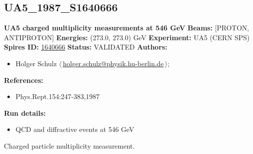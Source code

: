 \clearpage


\clearpage

\subsection[UA5\_1987\_S1640666]{UA5\_1987\_S1640666\,\cite{Alner:1987wb}}
\textbf{UA5 charged multiplicity measurements at 546 GeV}\newline
\textbf{Beams:} [PROTON, ANTIPROTON] \newline
\textbf{Energies:} (273.0, 273.0) GeV \newline
\textbf{Experiment:} UA5 (CERN SPS) \newline
\textbf{Spires ID:} \href{http://www.slac.stanford.edu/spires/find/hep/www?rawcmd=key+1640666}{1640666}\newline
\textbf{Status:} VALIDATED\newline
\textbf{Authors:}
\begin{itemize}
  \item Holger Schulz $\langle\,$\href{mailto:holger.schulz@physik.hu-berlin.de}{holger.schulz@physik.hu-berlin.de}$\,\rangle$;
\end{itemize}
\textbf{References:}
\begin{itemize}
  \item Phys.Rept.154:247-383,1987
\end{itemize}
\textbf{Run details:}
\begin{itemize}

  \item QCD and diffractive events at 546 GeV\end{itemize}

\noindent Charged particle multiplicity measurement.

\clearpage


\clearpage

